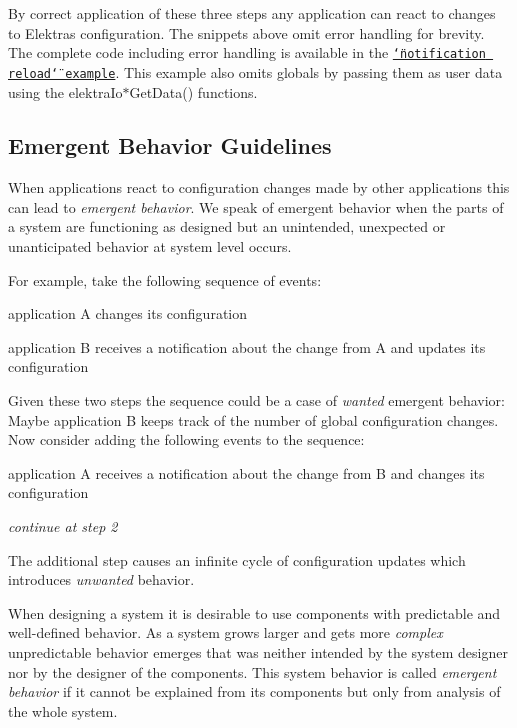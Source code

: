 By correct application of these three steps any application can react to changes to Elektra\textquotesingle{}s configuration. The snippets above omit error handling for brevity. The complete code including error handling is available in the \href{https://www.libelektra.org/examples/notificationreload}{\tt \char`\"{}notification reload\char`\"{} example}. This example also omits globals by passing them as user data using the {\ttfamily elektra\+Io$\ast$\+Get\+Data()} functions.

\subsection*{Emergent Behavior Guidelines}

When applications react to configuration changes made by other applications this can lead to {\itshape emergent behavior}. We speak of emergent behavior when the parts of a system are functioning as designed but an unintended, unexpected or unanticipated behavior at system level occurs.

For example, take the following sequence of events\+:


\begin{DoxyEnumerate}
\item application {\ttfamily A} changes its configuration
\item application {\ttfamily B} receives a notification about the change from {\ttfamily A} and updates its configuration

Given these two steps the sequence could be a case of {\itshape wanted} emergent behavior\+: Maybe application {\ttfamily B} keeps track of the number of global configuration changes. Now consider adding the following events to the sequence\+:
\item application {\ttfamily A} receives a notification about the change from {\ttfamily B} and changes its configuration
\item {\itshape continue at step 2}
\end{DoxyEnumerate}

The additional step causes an infinite cycle of configuration updates which introduces {\itshape unwanted} behavior.

When designing a system it is desirable to use components with predictable and well-\/defined behavior. As a system grows larger and gets more {\itshape complex} unpredictable behavior emerges that was neither intended by the system designer nor by the designer of the components. This system behavior is called {\itshape emergent behavior} if it cannot be explained from its components but only from analysis of the whole system.

